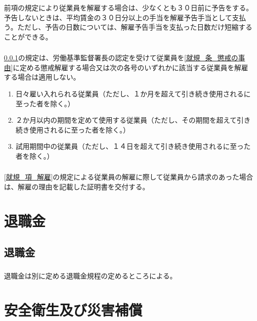 \documentclass{jsarticle}
\begin{document}
\subsubsection{}
\label{就規_項_解雇の予告}
前項の規定により従業員を解雇する場合は、少なくとも３０日前に予告をする。予告しないときは、平均賃金の３０日分以上の手当を解雇予告手当として支払う。ただし、予告の日数については、解雇予告手当を支払った日数だけ短縮することができる。
\subsubsection{}
\label{就規_項_懲戒解雇時の適用除外}
\ref{就規_項_解雇の予告}の規定は、労働基準監督署長の認定を受けて従業員を\ref{就規_条_懲戒の事由}に定める懲戒解雇する場合又は次の各号のいずれかに該当する従業員を解雇する場合は適用しない。
  \begin{enumerate}
    \item 日々雇い入れられる従業員（ただし、１か月を超えて引き続き使用されるに至った者を除く。）
    \item ２か月以内の期間を定めて使用する従業員（ただし、その期間を超えて引き続き使用されるに至った者を除く。）
    \item 試用期間中の従業員（ただし、１４日を超えて引き続き使用されるに至った者を除く。）
  \end{enumerate}
\subsubsection{}
\label{就規_項_解雇理由の証明書交付}
\ref{就規_項_解雇}の規定による従業員の解雇に際して従業員から請求のあった場合は、解雇の理由を記載した証明書を交付する。

\section{退職金}
\label{就規_章_退職金}

\subsection{退職金}
\label{就規_条_退職金}
\subsubsection{}
\label{就規_項_退職金}
退職金は別に定める退職金規程の定めるところによる。

\section{安全衛生及び災害補償}
\label{就規_章_安全衛生及び災害補償}
\end{document}
